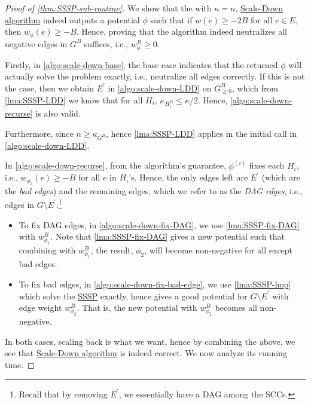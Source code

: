 \begin{proof}[Proof of \autoref{thm:SSSP-sub-routine}]
	We show that the with \(\kappa = n\), \hyperref[algo:scale-down]{Scale-Down algorithm} indeed outputs a potential \(\phi \) such that if \(w(e) \geq -2B\) for all \(e \in E\), then \(w_{\phi } (e) \geq -B\). Hence, proving that the algorithm indeed neutralizes all negative edges in \(G^B\) suffices, i.e., \(w_{\phi }^B \geq 0\).

	Firstly, in \autoref{algo:scale-down-base}, the base case indicates that the returned \(\phi \) will actually solve the problem exactly, i.e., neutralize all edges correctly. If this is not the case, then we obtain \(E^{\prime} \) in \autoref{algo:scale-down-LDD} on \(G^B_{\geq 0}\), which from \autoref{lma:SSSP-LDD} we know that for all \(H_i\), \(\kappa _{H_i^B} \leq \kappa / 2\). Hence, \autoref{algo:scale-down-recurse} is also valid.

	\begin{note}
		Furthermore, since \(n \geq \kappa _{G^B}\), hence \autoref{lma:SSSP-LDD} applies in the initial call in \autoref{algo:scale-down-LDD}.
	\end{note}

	In \autoref{algo:scale-down-recurse}, from the algorithm's guarantee, \(\phi ^{(i)}\) fixes each \(H_i\), i.e., \(w_{\phi _1}(e) \geq -B\) for all \(e\) in \(H_i\)'s. Hence, the only edges left are \(E^{\prime} \) (which are the \emph{bad edges}) and the remaining edges, which we refer to as the \emph{DAG edges}, i.e., edges in \(G \setminus E^{\prime} \).\footnote{Recall that by removing \(E^{\prime} \), we essentially have a DAG among the SCCs.}
	\begin{itemize}
		\item To fix DAG edges, in \autoref{algo:scale-down-fix-DAG}, we use \autoref{lma:SSSP-fix-DAG} with \(w_{\phi _1}^B\). Note that \autoref{lma:SSSP-fix-DAG} gives a new potential such that combining with \(w_{\phi _1}^B\), the result, \(\phi _2\), will become non-negative for all except bad edges.
		\item To fix bad edges, in \autoref{algo:scale-down-fix-bad-edge}, we use \autoref{lma:SSSP-hop} which solve the \hyperref[prb:SSSP]{SSSP} exactly, hence gives a good potential for \(G\setminus E^{\prime} \) with edge weight \(w_{\phi _2}^B\). That is, the new potential with \(w_{\phi _2}^B\) becomes all non-negative.
	\end{itemize}
	In both cases, scaling back is what we want, hence by combining the above, we see that \hyperref[algo:scale-down]{Scale-Down algorithm} is indeed correct. We now analyze its running time.
\end{proof}

